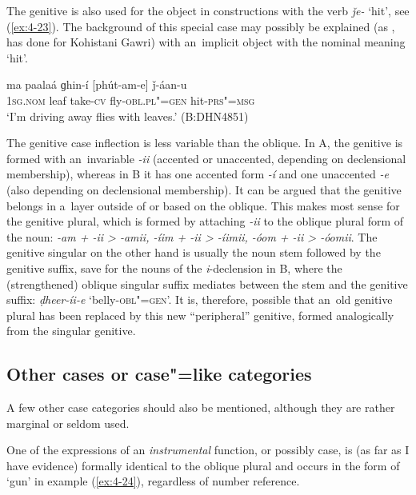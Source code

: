 The genitive is also used for the object in constructions with the verb \textit{ǰe-} `hit', see (\ref{ex:4-23}). The background of this special case may possibly be explained (as \citealt[43]{baart1999a}, has done for Kohistani Gawri) with an~implicit object with the nominal meaning `hit'.

\begin{exe}
\ex
\label{ex:4-23}
\gll ma paalaá ɡhin-í [phút-am-e] ǰ-áan-u \\
	\textsc{1sg.nom} leaf take-\textsc{cv} fly-\textsc{obl.pl"=gen} hit-\textsc{prs"=msg} \\
\glt `I'm driving away flies with leaves.' (B:DHN4851)
\end{exe}

The genitive case inflection is less variable than the oblique. In A, the genitive is formed with an~invariable \textit{-ii} (accented or unaccented, depending on declensional membership), whereas in B it has one accented form \textit{-í} and one unaccented \textit{-e} (also depending on declensional membership). It can be argued that the genitive belongs in a~layer outside of or based on the oblique. This makes most sense for the genitive plural, which is formed by attaching \textit{-ii} to the oblique plural form of the noun: \textit{-am + -ii {\textgreater} -amii, -íim + -ii {\textgreater} -íimii, -óom + -ii {\textgreater} -óomii}. The genitive singular on the other hand is usually the noun stem followed by the genitive suffix, save for the nouns of the \textit{i}-declension in B, where the (strengthened) oblique singular suffix mediates between the stem and the genitive suffix: \textit{ḍheer-íi-e} `belly-\textsc{obl"=gen}'. It is, therefore, possible that an~old genitive plural has been replaced by this new ``peripheral'' genitive, formed analogically from the singular genitive.

\subsection{Other cases or case"=like categories}
\label{subsec:4-5-4}

A few other case categories should also be mentioned, although they are rather marginal or seldom used. 


One of the expressions of an \textit{instrumental} function, or possibly case, is (as far as I have evidence) formally identical to the oblique plural and occurs in the form of `gun' in example (\ref{ex:4-24}), regardless of number reference. 


